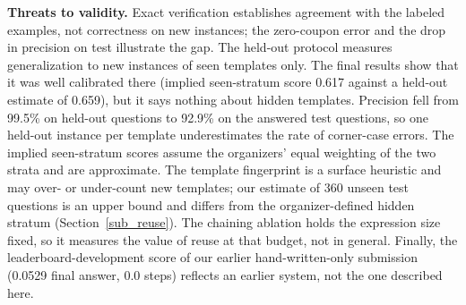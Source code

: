 \documentclass[conference]{IEEEtran}
\begin{document}
\textbf{Threats to validity.} Exact verification establishes agreement with the
labeled examples, not correctness on new instances; the zero-coupon error and
the drop in precision on test illustrate the gap. The held-out protocol measures
generalization to new instances of seen templates only. The final results show that it was well
calibrated there (implied seen-stratum score 0.617 against a held-out estimate
of 0.659), but it says nothing about hidden templates. Precision fell from 99.5\%
on held-out questions to 92.9\% on the answered test questions, so one held-out
instance per template underestimates the rate of corner-case errors. The
implied seen-stratum scores assume the organizers' equal weighting of the two
strata and are approximate. The template fingerprint is a surface heuristic and
may over- or under-count new templates; our estimate of 360 unseen test
questions is an upper bound and differs from the organizer-defined hidden
stratum (Section~\ref{sub_reuse}). The chaining ablation holds the expression
size fixed, so it measures the value of reuse at that budget, not in general. Finally, the leaderboard-development score of our
earlier hand-written-only submission (0.0529 final answer, 0.0 steps) reflects
an earlier system, not the one described here.

\end{document}
